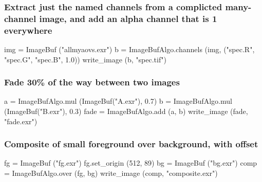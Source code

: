 \subsubsection*{Extract just the named channels from a complicted many-channel
image, and add an alpha channel that is 1 everywhere}
\begin{code}
    img = ImageBuf ("allmyaovs.exr")
    b = ImageBufAlgo.channels (img, ("spec.R", "spec.G", "spec.B", 1.0))
    write_image (b, "spec.tif")
\end{code}


\subsubsection*{Fade 30\% of the way between two images}

\begin{code}
    a = ImageBufAlgo.mul (ImageBuf("A.exr"), 0.7)
    b = ImageBufAlgo.mul (ImageBuf("B.exr"), 0.3)
    fade = ImageBufAlgo.add (a, b)
    write_image (fade, "fade.exr")
\end{code}


\subsubsection*{Composite of small foreground over background, with offset}

\begin{code}
    fg = ImageBuf ("fg.exr")
    fg.set_origin (512, 89)
    bg = ImageBuf ("bg.exr")
    comp = ImageBufAlgo.over (fg, bg)
    write_image (comp, "composite.exr")
\end{code}





\chapwidthend
